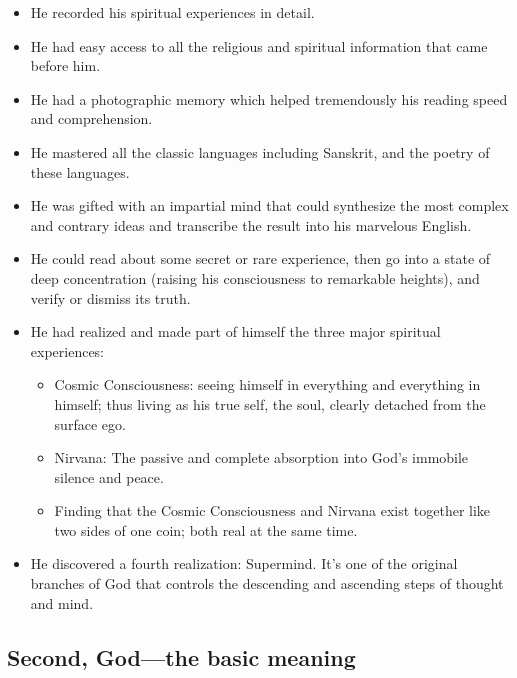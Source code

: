 \documentclass[12pt,a4paper]{book}
\begin{document}
\begin{itemize}
\renewcommand{\labelitemi}{$\diamond$}

\item He recorded his spiritual experiences in detail.

\item He had easy access to all the religious and spiritual
  information that came before him.

\item He had a photographic memory which helped tremendously his
  reading speed and comprehension.

\item He mastered all the classic languages including Sanskrit, and
  the poetry of these languages.

\item He was gifted with an impartial mind that could synthesize the
  most complex and contrary ideas and transcribe the result into his
  marvelous English.

\item He could read about some secret or rare experience, then go into
  a state of deep concentration (raising his consciousness to
  remarkable heights), and verify or dismiss its truth.

\item He had realized and made part of himself the three major
  spiritual experiences:

\begin{itemize}

\item Cosmic Consciousness: seeing himself in everything and
  everything in himself; thus living as his true self, the soul,
  clearly detached from the surface ego.

\item Nirvana: The passive and complete absorption into God's immobile
  silence and peace.

\item Finding that the Cosmic Consciousness and Nirvana exist together
  like two sides of one coin; both real at the same time.
\end{itemize}

\item He discovered a fourth realization: Supermind. It's one of the
  original branches of God that controls the descending and ascending
  steps of thought and mind.
\end{itemize}


\subsection*{Second, God---the basic meaning}
\end{document}
